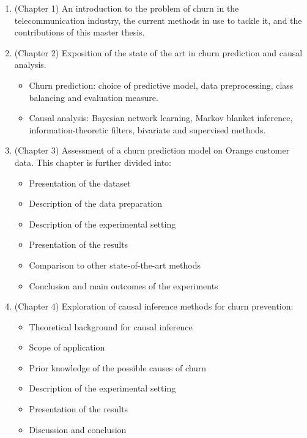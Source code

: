\begin{enumerate}
	\item (Chapter 1) An introduction to the problem of churn in the
	telecommunication industry, the current methods in use to tackle it, and the
	contributions of this master thesis.

    \item (Chapter 2) Exposition of the state of the art in churn prediction
    and causal analysis.
    \begin{itemize}
        \item Churn prediction: choice of predictive model, data preprocessing,
        class balancing and evaluation measure.
        \item Causal analysis: Bayesian network learning, Markov blanket
        inference, information-theoretic filters, bivariate and supervised
        methods.
    \end{itemize}

	\item (Chapter 3) Assessment of a churn prediction model on Orange customer
	data. This chapter is further divided into:
	\begin{itemize}
		\item Presentation of the dataset
		\item Description of the data preparation
		\item Description of the experimental setting
		\item Presentation of the results
        \item Comparison to other state-of-the-art methods
		\item Conclusion and main outcomes of the experiments
	\end{itemize}

    \item (Chapter 4) Exploration of causal inference methods for churn
    prevention:
    \begin{itemize}
        \item Theoretical background for causal inference
        \item Scope of application
        \item Prior knowledge of the possible causes of churn
        \item Description of the experimental setting
        \item Presentation of the results
        \item Discussion and conclusion
    \end{itemize}


\end{enumerate}
